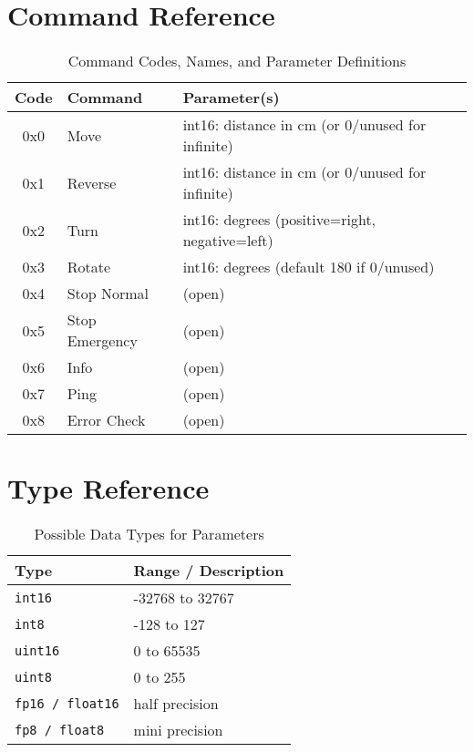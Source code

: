 \documentclass[a4paper,11pt]{article}
\begin{document}
\section{Command Reference}

\begin{table}[h!]
\centering
\begin{tabular}{>{\ttfamily}c l l}
\toprule
\textnormal{Code} & \textnormal{Command} & \textnormal{Parameter(s)} \\
\midrule
0x0 & Move & int16: distance in cm (or 0/unused for infinite) \\
0x1 & Reverse & int16: distance in cm (or 0/unused for infinite) \\
0x2 & Turn & int16: degrees (positive=right, negative=left) \\
0x3 & Rotate & int16: degrees (default 180 if 0/unused) \\
0x4 & Stop Normal & (open) \\
0x5 & Stop Emergency & (open) \\
0x6 & Info & (open) \\
0x7 & Ping & (open) \\
0x8 & Error Check & (open) \\
\bottomrule
\end{tabular}
\caption{Command Codes, Names, and Parameter Definitions}
\label{tab:commands}
\end{table}

\section{Type Reference}

\begin{table}[h!]
\centering
\begin{tabular}{l l}
\toprule
\textbf{Type} & \textbf{Range / Description} \\
\midrule
\texttt{int16} & -32768 to 32767 \\
\texttt{int8} & -128 to 127 \\
\texttt{uint16} & 0 to 65535 \\
\texttt{uint8} & 0 to 255 \\
\texttt{fp16 / float16} & half precision \\
\texttt{fp8 / float8} & mini precision \\
\bottomrule
\end{tabular}
\caption{Possible Data Types for Parameters}
\label{tab:types}
\end{table}
\end{document}
